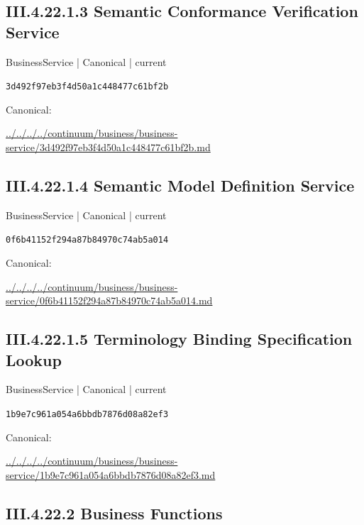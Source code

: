 \documentclass[10pt,a4paper]{article}
\begin{document}
\subsection*{III.4.22.1.3 Semantic Conformance Verification Service}
{\small BusinessService | Canonical | current}\par
\texttt{3d492f97eb3f4d50a1c448477c61bf2b}\par
Canonical: \par
{\footnotesize\url{../../../../continuum/business/business-service/3d492f97eb3f4d50a1c448477c61bf2b.md}}\par
\subsection*{III.4.22.1.4 Semantic Model Definition Service}
{\small BusinessService | Canonical | current}\par
\texttt{0f6b41152f294a87b84970c74ab5a014}\par
Canonical: \par
{\footnotesize\url{../../../../continuum/business/business-service/0f6b41152f294a87b84970c74ab5a014.md}}\par
\subsection*{III.4.22.1.5 Terminology Binding Specification Lookup}
{\small BusinessService | Canonical | current}\par
\texttt{1b9e7c961a054a6bbdb7876d08a82ef3}\par
Canonical: \par
{\footnotesize\url{../../../../continuum/business/business-service/1b9e7c961a054a6bbdb7876d08a82ef3.md}}\par
\subsection*{III.4.22.2 Business Functions}
\end{document}
